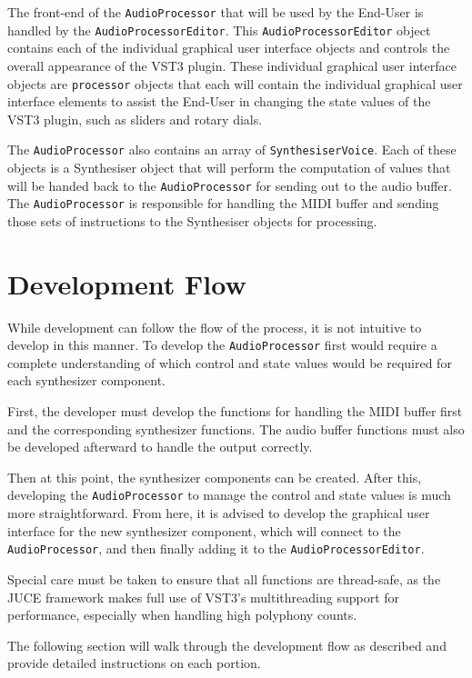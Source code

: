 \documentclass[a4paper,12pt]{report}
\begin{document}
The front-end of the \texttt{AudioProcessor} that will be used by the End-User is handled by the \texttt{AudioProcessorEditor}. This \texttt{AudioProcessorEditor} object contains each of the individual graphical user interface objects and controls the overall appearance of the VST3 plugin. These individual graphical user interface objects are \texttt{processor} objects that each will contain the individual graphical user interface elements to assist the End-User in changing the state values of the VST3 plugin, such as sliders and rotary dials.

The \texttt{AudioProcessor} also contains an array of \texttt{SynthesiserVoice}. Each of these objects is a Synthesiser object that will perform the computation of values that will be handed back to the \texttt{AudioProcessor}  for sending out to the audio buffer. The \texttt{AudioProcessor} is responsible for handling the MIDI buffer and sending those sets of instructions to the Synthesiser objects for processing.

\section{Development Flow}
While development can follow the flow of the process, it is not intuitive to develop in this manner. To develop the \texttt{AudioProcessor} first would require a complete understanding of which control and state values would be required for each synthesizer component.

First, the developer must develop the functions for handling the MIDI buffer first and the corresponding synthesizer functions. The audio buffer functions must also be developed afterward to handle the output correctly.

Then at this point, the synthesizer components can be created. After this, developing the \texttt{AudioProcessor} to manage the control and state values is much more straightforward. From here, it is advised to develop the graphical user interface for the new synthesizer component, which will connect to the \texttt{AudioProcessor}, and then finally adding it to the \texttt{AudioProcessorEditor}.

Special care must be taken to ensure that all functions are thread-safe, as the JUCE framework makes full use of VST3's multithreading support for performance, especially when handling high polyphony counts.

The following section will walk through the development flow as described and provide detailed instructions on each portion.
\end{document}
